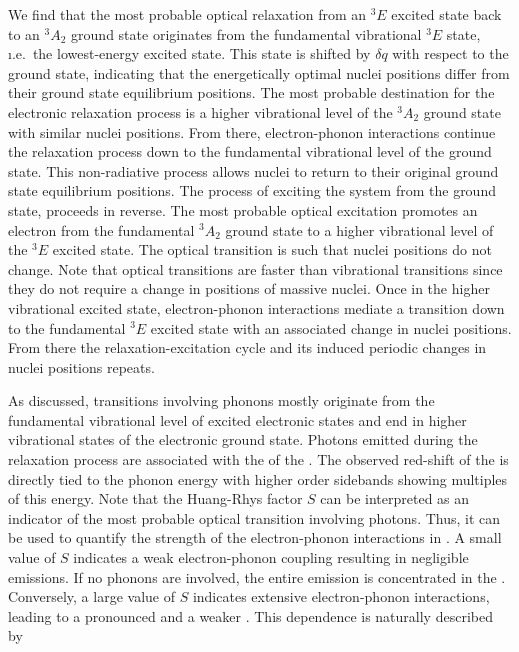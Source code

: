    We find that the most probable optical relaxation from an ${}^{3}E$ excited state back to an ${}^{3}A_{2}$ ground state originates from the fundamental vibrational ${}^{3}E$ state, \i.e.\ the lowest-energy excited state. This state is shifted by $\delta q$ with respect to the ground state, indicating that the energetically optimal nuclei positions differ from their ground state equilibrium positions. The most probable destination for the electronic relaxation process is a higher vibrational level of the ${}^{3}A_{2}$ ground state with similar nuclei positions. From there, electron-phonon interactions continue the relaxation process down to the fundamental vibrational level of the ground state. This non-radiative process allows nuclei to return to their original ground state equilibrium positions.
   The process of exciting the system from the ground state, proceeds in reverse. The most probable optical excitation promotes an electron from the fundamental ${}^{3}A_{2}$ ground state to a higher vibrational level of the ${}^{3}E$ excited state. The optical transition is such that nuclei positions do not change. Note that optical transitions are faster than vibrational transitions since they do not require a change in positions of massive nuclei. Once in the higher vibrational excited state, electron-phonon interactions mediate a transition down to the fundamental ${}^{3}E$ excited state with an associated change in nuclei positions. From there the relaxation-excitation cycle and its induced periodic changes in nuclei positions repeats.

   As discussed, transitions involving phonons mostly originate from the fundamental vibrational level of excited electronic states and end in higher vibrational states of the electronic ground state. Photons emitted during the relaxation process are associated with the \psb of the \siv.
   The observed red-shift of the \psb is directly tied to the phonon energy with higher order sidebands showing multiples of this energy. Note that the Huang-Rhys factor $S$ can be interpreted as an indicator of the most probable optical transition involving photons. Thus, it can be used to quantify the strength of the electron-phonon interactions in \sivs. A small value of $S$ indicates a weak electron-phonon coupling resulting in negligible \psb emissions. If no phonons are involved, the entire emission is concentrated in the \zpl. Conversely, a large value of $S$ indicates extensive electron-phonon interactions, leading to a pronounced \psb and a weaker \zpl. This dependence is naturally described by

